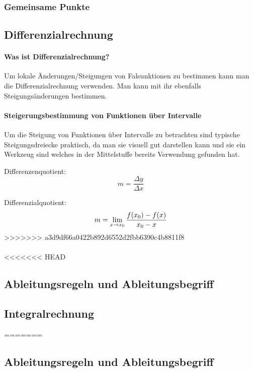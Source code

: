 \documentclass{article}
\begin{document}
\subsubsection{Gemeinsame Punkte}

\subsection{Differenzialrechnung}
\paragraph{Was ist Differenzialrechnung?}

Um lokale Änderungen/Steigungen von Falsunktionen zu bestimmen kann man die Differenzialrechnung verwenden.
Man kann mit ihr ebenfalls Steigungsänderungen bestimmen.
\paragraph{Steigerungsbestimmung von Funktionen über Intervalle}

Um die Steigung von Funktionen über Intervalle zu betrachten sind typische Steigungsdreiecke praktisch,
da man sie visuell gut darstellen kann und sie ein Werkzeug sind welches in der Mittelstuffe bereits
Verwendung gefunden hat.

Differenzenquotient:
\[
    m = {\frac {\Delta y} {\Delta x}}
\]

Differenzialquotient:
\[
    m = \lim_{x \to x_{0}} {{f(x_{0}) - f(x)} \over { x_{0} - x}}
\]
>>>>>>> a3d9df66a0422b892d6552d2fbb6390c4b8811f8



		\paragraph{}

<<<<<<< HEAD
	\subsection{Ableitungsregeln und Ableitungsbegriff}\label{Ableitungen}
	
	\subsection{Integralrechnung}\label{Integralrechnung}
=======
\subsection{Ableitungsregeln und Ableitungsbegriff}\label{Ableitungen}
\end{document}
